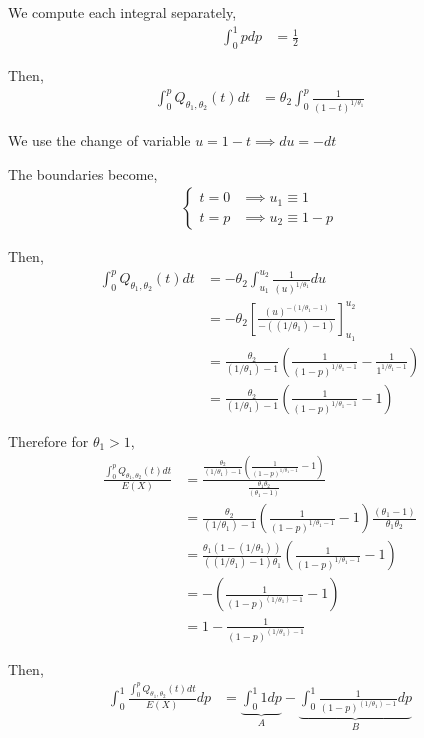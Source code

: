 We compute each integral separately,
\begin{align*}
  \int_0^1 pdp 
    &= \frac{1}{2}
\end{align*}

Then,
\begin{align*}
  \int_0^p Q_{\theta_1, \theta_2}(t) dt 
    &= \theta_2 \int_0^p \frac{1}{(1 - t)^{1/\theta_1}}
\end{align*}

We use the change of variable $u = 1 - t \implies du = -dt$ 

The boundaries become, 
\begin{align*}
  \begin{cases}
    t = 0 &\implies u_1 \equiv 1 \\
    t = p &\implies u_2 \equiv 1 - p
  \end{cases}
\end{align*}

Then, 
\begin{align*}
  \int_0^p Q_{\theta_1, \theta_2}(t) dt 
    &= -\theta_2 \int_{u_1}^{u_2} \frac{1}{(u)^{1/\theta_1}} du \\
    &= -\theta_2 \left[ \frac{(u)^{-(1/\theta_1 - 1)}}{-((1/\theta_1) - 1)} \right]_{u_1}^{u_2} \\
    &= \frac{\theta_2}{(1/\theta_1) - 1} \left( \frac{1}{(1-p)^{1/\theta_1 - 1}} - \frac{1}{1^{1/\theta_1 - 1}} \right) \\
    &= \frac{\theta_2}{(1/\theta_1) - 1} \left( \frac{1}{(1-p)^{1/\theta_1 - 1}} - 1 \right)
\end{align*}

Therefore for $\theta_1 > 1$, 
\begin{align*}
  \frac{\int_{0}^{p} Q_{\theta_1, \theta_2}(t) dt}{E(X)}
    &= \frac{\frac{\theta_2}{(1/\theta_1) - 1} \left( \frac{1}{(1-p)^{1/\theta_1 - 1}} - 1 \right)}{\frac{\theta_1 \theta_2}{(\theta_1 - 1)}} \\
    &= \frac{\theta_2}{(1/\theta_1) - 1} \left( \frac{1}{(1-p)^{1/\theta_1 - 1}} - 1 \right) \frac{(\theta_1 - 1)}{\theta_1 \theta_2} \\
    &= \frac{\theta_1(1 - (1/\theta_1))}{((1/\theta_1) - 1)\theta_1} \left( \frac{1}{(1-p)^{1/\theta_1 - 1}} - 1 \right) \\
    &= - \left( \frac{1}{(1-p)^{(1/\theta_1) - 1}} - 1 \right) \\
    &= 1 - \frac{1}{(1-p)^{(1/\theta_1) - 1}}
\end{align*}

Then,
\begin{align*}
  \int_{0}^{1} \frac{\int_{0}^{p} Q_{\theta_1, \theta_2}(t) dt}{E(X)} dp 
    &= \underbrace{\int_0^1 1 dp}_{A} - \underbrace{\int_0^1 \frac{1}{(1-p)^{(1/\theta_1) - 1}} dp}_{B}
\end{align*}


